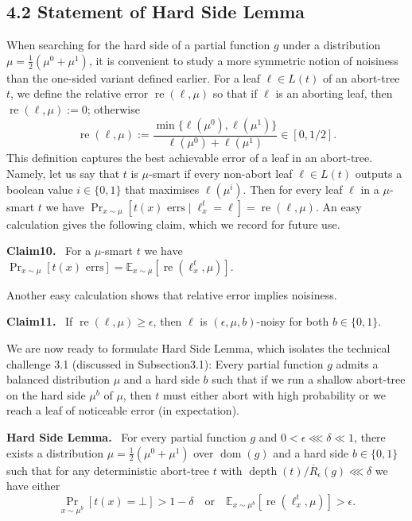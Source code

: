 \documentclass[10pt,a4paper]{article}
\newenvironment{authorclaim}[1]{\par\medskip\noindent\textbf{#1.}\ }{\par\medskip}
\begin{document}
\subsection*{4.2 Statement of Hard Side Lemma}
When searching for the hard side of a partial function $g$ under a distribution $\mu=\frac12(\mu^0+\mu^1)$, it is convenient to study a more symmetric notion of noisiness than the one-sided variant defined earlier. For a leaf $\ell\in L(t)$ of an abort-tree $t$, we define the relative error $\operatorname{re}(\ell,\mu)$ so that if $\ell$ is an aborting leaf, then $\operatorname{re}(\ell,\mu):=0$; otherwise
\[\operatorname{re}(\ell,\mu):=\frac{\min\{\ell(\mu^0),\ell(\mu^1)\}}{\ell(\mu^0)+\ell(\mu^1)}\in[0,1/2].\]
This definition captures the best achievable error of a leaf in an abort-tree. Namely, let us say that $t$ is $\mu$-smart if every non-abort leaf $\ell\in L(t)$ outputs a boolean value $i\in\{0,1\}$ that maximises $\ell(\mu^i)$. Then for every leaf $\ell$ in a $\mu$-smart $t$ we have $\Pr_{x\sim\mu}[t(x)\text{ errs}\mid\ell_x^t=\ell]=\operatorname{re}(\ell,\mu)$. An easy calculation gives the following claim, which we record for future use.
\begin{authorclaim}{Claim10}
For a $\mu$-smart $t$ we have $\Pr_{x\sim\mu}[t(x)\text{ errs}]=\mathbb E_{x\sim\mu}[\operatorname{re}(\ell_x^t,\mu)]$.
\end{authorclaim}
Another easy calculation shows that relative error implies noisiness.
\begin{authorclaim}{Claim11}
If $\operatorname{re}(\ell,\mu)\ge\epsilon$, then $\ell$ is $(\epsilon,\mu,b)$-noisy for both $b\in\{0,1\}$.
\end{authorclaim}
We are now ready to formulate Hard Side Lemma, which isolates the technical challenge 3.1 (discussed in Subsection3.1): Every partial function $g$ admits a balanced distribution $\mu$ and a hard side $b$ such that if we run a shallow abort-tree on the hard side $\mu^b$ of $\mu$, then $t$ must either abort with high probability or we reach a leaf of noticeable error (in expectation).
\begin{authorclaim}{Hard Side Lemma}
For every partial function $g$ and $0<\epsilon\lll\delta\ll1$, there exists a distribution $\mu=\frac12(\mu^0+\mu^1)$ over $\operatorname{dom}(g)$ and a hard side $b\in\{0,1\}$ such that for any deterministic abort-tree $t$ with $\operatorname{depth}(t)/\overline R_\epsilon(g)\lll\delta$ we have either
\begin{equation}\tag{3}\Pr_{x\sim\mu^b}[t(x)=\bot]>1-\delta\quad\text{or}\quad\mathbb E_{x\sim\mu^b}[\operatorname{re}(\ell_x^t,\mu)]>\epsilon.\end{equation}
\end{authorclaim}
\end{document}
